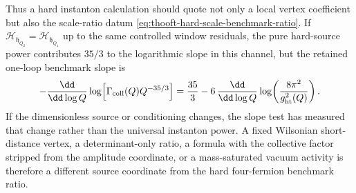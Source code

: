 \begin{controlledapproximation}
Thus a hard instanton calculation should quote not only a local vertex
coefficient but also the scale-ratio datum
\eqref{eq:thooft-hard-scale-benchmark-ratio}.  If
\(\mathcal H_{\mathfrak h_{Q_2}}=\mathcal H_{\mathfrak h_{Q_1}}\) up to the
same controlled window residuals, the pure hard-source power contributes
\(35/3\) to the logarithmic slope in this channel, but the retained
one-loop benchmark slope is
\[
  -\frac{\dd}{\dd\log Q}
  \log\!\left[
    \Gamma_{\rm coll}(Q)Q^{-35/3}
  \right]
  =
  \frac{35}{3}
  -
  6\,
  \frac{\dd}{\dd\log Q}
  \log\!\left(\frac{8\pi^2}{g_{\rm ht}^2(Q)}\right).
\]
If the dimensionless source or conditioning changes, the slope test has
measured that change rather than the universal instanton power.  A fixed
Wilsonian short-distance vertex, a determinant-only ratio, a formula with the
collective factor stripped from the amplitude coordinate, or a mass-saturated
vacuum activity is therefore a different source coordinate from the hard
four-fermion benchmark ratio.
\end{controlledapproximation}

